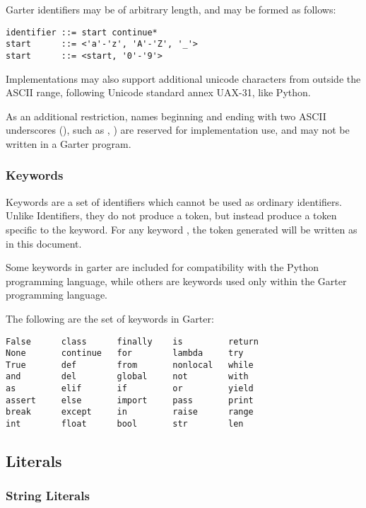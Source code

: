Garter identifiers may be of arbitrary length, and may be formed as follows:

\begin{lstlisting}
identifier ::= start continue*
start      ::= <'a'-'z', 'A'-'Z', '_'>
start      ::= <start, '0'-'9'>
\end{lstlisting}

Implementations may also support additional unicode characters from outside the
ASCII range, following Unicode standard annex UAX-31, like Python.

As an additional restriction, names beginning and ending with two ASCII
underscores (\code{\_\_}), such as , ) are
reserved for implementation use, and may not be written in a Garter program.

\subsubsection{Keywords}

Keywords are a set of identifiers which cannot be used as ordinary identifiers.
Unlike Identifiers, they do not produce a  token, but instead produce
a token specific to the keyword. For any keyword , the token generated
will be written as  in this document.

Some keywords in garter are included for compatibility with the Python
programming language, while others are keywords used only within the Garter
programming language.

The following are the set of keywords in Garter:

\begin{lstlisting}
False      class      finally    is         return
None       continue   for        lambda     try
True       def        from       nonlocal   while
and        del        global     not        with
as         elif       if         or         yield
assert     else       import     pass       print
break      except     in         raise      range
int        float      bool       str        len
\end{lstlisting}

\subsection{Literals}

\subsubsection{String Literals}
\label{sec:string_literals}

